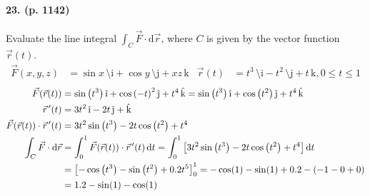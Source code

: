 \documentclass[A4, 12pt]{article}
\renewcommand{\d}{\mathrm{d}}
\newcommand{\vi}{\text{\^\i}}
\newcommand{\vj}{\text{\^\j}}
\newcommand{\vk}{\text{\^k}}
\newcommand{\vps}{\hspace{0.5mm}}
\begin{document}
	\paragraph{23. (p. 1142)}
		Evaluate the line integral $\int_C \vec{F} \cdot \d\vec{r}$, where $C$ is given by the vector function $\vec{r}(t)$.
		\begin{align*}
			\vec{F}(x, y, z) &= \sin x\,\vi + \cos y\,\vj + xz\,\vk &
				\vec{r}(t) &= t^3\,\vi - t^2\,\vj + t\,\vk, 0 \le t \le 1
		\end{align*}
		\begin{align*}
			\vec{F}(\vec{r}(t)) &= \sin\left(t^3\right)\vi + \cos\left(-t\right)^2\vj + t^4\,\vk 
					= \sin\left(t^3\right)\vi + \cos\left(t^2\right)\vj + t^4\,\vk \\
			\vec{r}\vps'(t) &= 3t^2\,\vi - 2t\,\vj + \vk \\
			\vec{F}(\vec{r}(t)) \cdot \vec{r}\vps'(t) &= 3t^2\sin\left(t^3\right) - 2t\cos\left(t^2\right) + t^4 \\
			\int_C \vec{F} \cdot \d\vec{r} &= \int_0^1 \vec{F}(\vec{r}(t)) \cdot \vec{r}\vps'(t)\,\d t
					= \int_0^1\left[3t^2\sin\left(t^3\right) - 2t\cos\left(t^2\right) + t^4\right]\d t \\
				&= \left[-\cos\left(t^3\right) - \sin\left(t^2\right) + 0.2t^5\right]_0^1
					= -\cos(1) - \sin(1) + 0.2 - (-1 - 0 + 0) \\
				&= 1.2 - \sin(1) - \cos(1)
		\end{align*}
\end{document}
